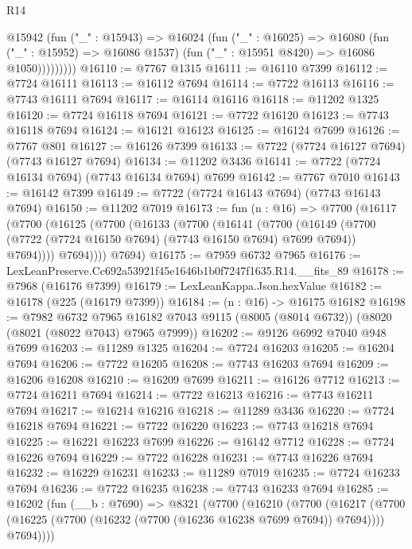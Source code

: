\begin{lexlean}{R14}
\begin{coremodule}
              @15942
                (fun ("_" : @15943) =>
                @16024
                  (fun ("_" : @16025) =>
                  @16080
                    (fun ("_" : @15952) => @16086 @1537)
                    (fun ("_" : @15951 @8420) => @16086 @1050)))))))))
@16110 := @7767 @1315
@16111 := @16110 @7399
@16112 := @7724 @16111
@16113 := @16112 @7694
@16114 := @7722 @16113
@16116 := @7743 @16111 @7694
@16117 := @16114 @16116
@16118 := @11202 @1325
@16120 := @7724 @16118 @7694
@16121 := @7722 @16120
@16123 := @7743 @16118 @7694
@16124 := @16121 @16123
@16125 := @16124 @7699
@16126 := @7767 @801
@16127 := @16126 @7399
@16133 := @7722 (@7724 @16127 @7694) (@7743 @16127 @7694)
@16134 := @11202 @3436
@16141 := @7722 (@7724 @16134 @7694) (@7743 @16134 @7694) @7699
@16142 := @7767 @7010
@16143 := @16142 @7399
@16149 := @7722 (@7724 @16143 @7694) (@7743 @16143 @7694)
@16150 := @11202 @7019
@16173 := fun (n : @16) =>
  @7700
    (@16117
      (@7700
        (@16125
          (@7700
            (@16133
              (@7700
                (@16141
                  (@7700
                    (@16149
                      (@7700 (@7722 (@7724 @16150 @7694) (@7743 @16150 @7694) @7699 @7694))
                      @7694))))
              @7694))))
      @7694)
@16175 := @7959 @6732 @7965
@16176 := LexLeanPreserve.Cc692a53921f45e1646b1b0f7247f1635.R14.__fits_89
@16178 := @7968 (@16176 @7399)
@16179 := LexLeanKappa.Json.hexValue
@16182 := @16178 (@225 (@16179 @7399))
@16184 := (n : @16) -> @16175 @16182
@16198 := @7982
    @6732
    @7965
    @16182
    @7043
    @9115
    (@8005 (@8014 @6732))
    (@8020 (@8021 (@8022 @7043) @7965 @7999))
@16202 := @9126 @6992 @7040 @948 @7699
@16203 := @11289 @1325
@16204 := @7724 @16203
@16205 := @16204 @7694
@16206 := @7722 @16205
@16208 := @7743 @16203 @7694
@16209 := @16206 @16208
@16210 := @16209 @7699
@16211 := @16126 @7712
@16213 := @7724 @16211 @7694
@16214 := @7722 @16213
@16216 := @7743 @16211 @7694
@16217 := @16214 @16216
@16218 := @11289 @3436
@16220 := @7724 @16218 @7694
@16221 := @7722 @16220
@16223 := @7743 @16218 @7694
@16225 := @16221 @16223 @7699
@16226 := @16142 @7712
@16228 := @7724 @16226 @7694
@16229 := @7722 @16228
@16231 := @7743 @16226 @7694
@16232 := @16229 @16231
@16233 := @11289 @7019
@16235 := @7724 @16233 @7694
@16236 := @7722 @16235
@16238 := @7743 @16233 @7694
@16285 := @16202
    (fun (__b : @7690) =>
    @8321
      (@7700
        (@16210
          (@7700
            (@16217
              (@7700 (@16225 (@7700 (@16232 (@7700 (@16236 @16238 @7699 @7694)) @7694))))
              @7694))))

\end{coremodule}
\end{lexlean}

